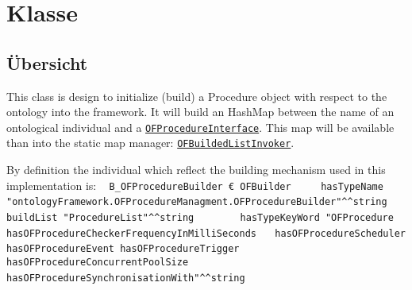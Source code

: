 
\section[OFProcedureBuilder]{Klasse }\label{ontologyFramework.OFProcedureManagment.OFProcedureBuilder-class}
\subsection{Übersicht}
This class is design to initialize (build) a Procedure
 object with respect to the ontology into the framework. It
 will build an HashMap between the name of an ontological individual 
 and a \texttt{\hyperlink{ontologyFramework.OFProcedureManagment.OFProcedureInterface-class}{OFProcedureInterface}}.
 This map will be available than into the static map manager: 
 \texttt{\hyperlink{ontologyFramework.OFRunning.OFInvokingManager.OFBuildedListInvoker-class}{OFBuildedListInvoker}}.
 
 By definition the individual which reflect the building mechanism 
 used in this implementation is:
 {\ttfamily
\mbox{ }	\verb!B_OFProcedureBuilder € OFBuilder !\mbox{ }\mbox{ }\mbox{}\newline
\mbox{ }		\verb!hasTypeName "ontologyFramework.OFProcedureManagment.OFProcedureBuilder"^^string!\mbox{}\newline
\mbox{ }		\verb!buildList "ProcedureList"^^string!\mbox{ }\mbox{ }\mbox{ }\mbox{ }\mbox{ }\mbox{ }\mbox{}\newline
\mbox{ }		\verb!hasTypeKeyWord "OFProcedure hasOFProcedureCheckerFrequencyInMilliSeconds!\mbox{ }\mbox{}\newline
\mbox{ }			\verb!hasOFProcedureScheduler hasOFProcedureEvent hasOFProcedureTrigger!\mbox{}\newline
\mbox{ }			\verb!hasOFProcedureConcurrentPoolSize hasOFProcedureSynchronisationWith"^^string!\mbox{ }\mbox{}\newline
\mbox{ }}


